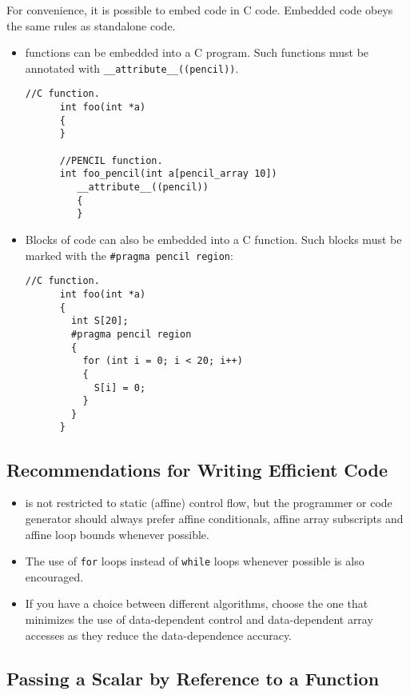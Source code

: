 For convenience, it is possible to embed \pencil code in C code.
Embedded \pencil code obeys the same rules as standalone \pencil code.

\begin{itemize}
  \item \pencil functions can be embedded into a C program.
    Such functions must be annotated with \lstinline!__attribute__((pencil))!.
    \begin{lstlisting}[language=pencil]
      //C function.
      int foo(int *a)
      {
      }

      //PENCIL function.
      int foo_pencil(int a[pencil_array 10])
         __attribute__((pencil))
         {
         }
       \end{lstlisting}

  \item Blocks of \pencil code can also be embedded into a C function.
    Such blocks must be marked with the \lstinline!#pragma pencil region!:
    \begin{lstlisting}[language=pencil]
      //C function.
      int foo(int *a)
      {
        int S[20];
        #pragma pencil region
        {
          for (int i = 0; i < 20; i++)
          {
            S[i] = 0;
          }
        }
      }
    \end{lstlisting}
\end{itemize}


\subsection{Recommendations for Writing Efficient \pencil Code}

\begin{itemize}
\item \pencil is not restricted to static (affine) control flow, but
  the programmer or code generator should always prefer affine
  conditionals, affine array subscripts and affine loop bounds
  whenever possible.
\item The use of \lstinline!for! loops instead of \lstinline!while!
  loops whenever possible is also encouraged.
\item If you have a choice between different algorithms, choose the
  one that minimizes the use of data-dependent control and
  data-dependent array accesses as they reduce the data-dependence
  accuracy.
\end{itemize}

\subsection{Passing a Scalar by Reference to a Function}

